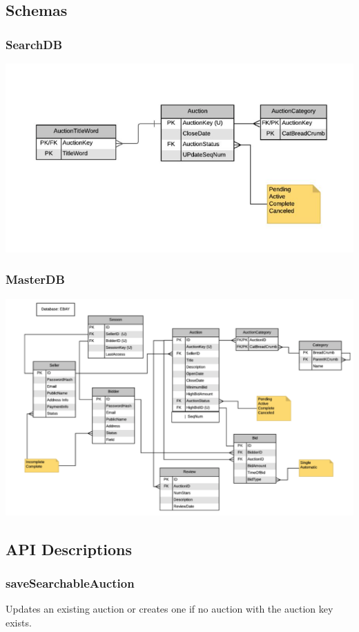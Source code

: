 \documentclass[12pt,a4paper]{article}
\begin{document}
\subsection{Schemas}

\subsubsection{SearchDB}
\includegraphics[scale=0.5]{images/search-schema.png}
\subsubsection{MasterDB}
\includegraphics[scale=0.35]{images/master-schema.png}
\pagebreak
\subsection{API Descriptions}

\subsubsection{saveSearchableAuction}
\label{ref:csa}
Updates an existing auction or creates one if no auction with the auction key
exists.
\end{document}
